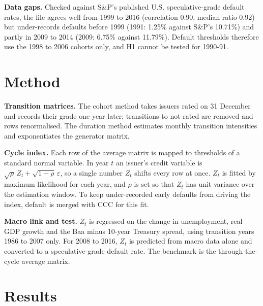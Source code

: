 \documentclass[11pt]{article}
\begin{document}
\begin{warnbox}
\textbf{Data gaps.} Checked against S\&P's published U.S. speculative-grade default rates, the file agrees well from 1999 to 2016 (correlation 0.90, median ratio 0.92) but under-records defaults before 1999 (1991: 1.25\% against S\&P's 10.71\%) and partly in 2009 to 2014 (2009: 6.75\% against 11.79\%). Default thresholds therefore use the 1998 to 2006 cohorts only, and H1 cannot be tested for 1990-91.
\end{warnbox}

\section{Method}

\textbf{Transition matrices.} The cohort method takes issuers rated on 31 December and records their grade one year later; transitions to not-rated are removed and rows renormalised. The duration method estimates monthly transition intensities and exponentiates the generator matrix.

\textbf{Cycle index.} Each row of the average matrix is mapped to thresholds of a standard normal variable. In year $t$ an issuer's credit variable is $\sqrt{\rho}\,Z_t + \sqrt{1-\rho}\,\varepsilon$, so a single number $Z_t$ shifts every row at once. $Z_t$ is fitted by maximum likelihood for each year, and $\rho$ is set so that $Z_t$ has unit variance over the estimation window. To keep under-recorded early defaults from driving the index, default is merged with CCC for this fit.

\textbf{Macro link and test.} $Z_t$ is regressed on the change in unemployment, real GDP growth and the Baa minus 10-year Treasury spread, using transition years 1986 to 2007 only. For 2008 to 2016, $Z_t$ is predicted from macro data alone and converted to a speculative-grade default rate. The benchmark is the through-the-cycle average matrix.

\section{Results}
\end{document}

